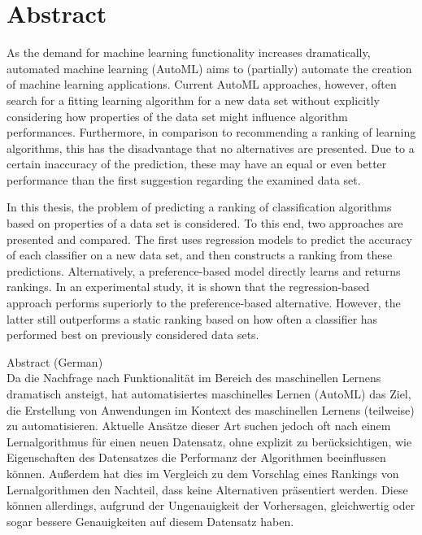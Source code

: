 \chapter*{Abstract}
\label{sec:abstract}
\vspace*{-10mm}

As the demand for machine learning functionality increases dramatically, automated machine learning (AutoML) aims to (partially) automate the creation of machine learning applications. Current AutoML approaches, however, often search for a fitting learning algorithm for a new data set without explicitly considering how properties of the data set might influence algorithm performances. Furthermore, in comparison to recommending a ranking of learning algorithms, this has the disadvantage that no alternatives are presented. Due to a certain inaccuracy of the prediction, these may have an equal or even better performance than the first suggestion regarding the examined data set.

In this thesis, the problem of predicting a ranking of classification algorithms based on properties of a data set is considered. To this end, two approaches are presented and compared. The first uses regression models to predict the accuracy of each classifier on a new data set, and then constructs a ranking from these predictions. Alternatively, a preference-based model directly learns and returns rankings. In an experimental study, it is shown that the regression-based approach performs superiorly to the preference-based alternative. However, the latter still outperforms a static ranking based on how often a classifier has performed best on previously considered data sets.

\vspace*{20mm}
\newpage

{Abstract (German)}\label{sec:abstract-german} \\

Da die Nachfrage nach Funktionalität im Bereich des maschinellen Lernens dramatisch ansteigt, hat automatisiertes maschinelles Lernen (AutoML) das Ziel, die Erstellung von Anwendungen im Kontext des maschinellen Lernens (teilweise) zu automatisieren. Aktuelle Ansätze dieser Art suchen jedoch oft nach einem Lernalgorithmus für einen neuen Datensatz, ohne explizit zu berücksichtigen, wie Eigenschaften des Datensatzes die Performanz der Algorithmen beeinflussen können. Außerdem hat dies im Vergleich zu dem Vorschlag eines Rankings von Lernalgorithmen den Nachteil, dass keine Alternativen präsentiert werden. Diese können allerdings, aufgrund der Ungenauigkeit der Vorhersagen, gleichwertig oder sogar bessere Genauigkeiten auf diesem Datensatz haben.

